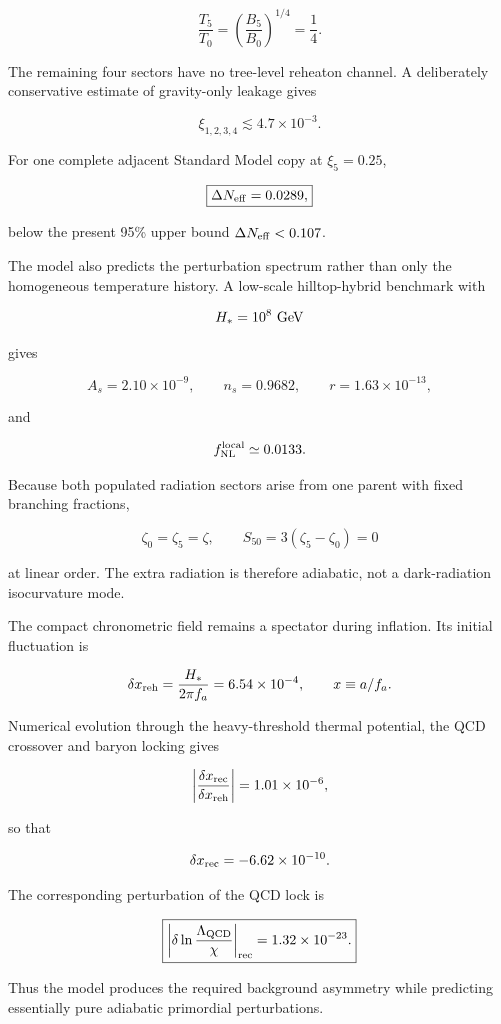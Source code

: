 \documentclass[
  10pt,
]{article}
\begin{document}
\[
\boxed{
\frac{T_5}{T_0}
=
\left(\frac{B_5}{B_0}\right)^{1/4}
=\frac14.
}
\]

The remaining four sectors have no tree-level reheaton channel. A
deliberately conservative estimate of gravity-only leakage gives

\[
\xi_{1,2,3,4}\lesssim4.7\times10^{-3}.
\]

For one complete adjacent Standard Model copy at \(\xi_5=0.25\),

\[
\boxed{
\Delta N_{\rm eff}=0.0289,
}
\]

below the present 95\% upper bound \(\Delta N_{\rm eff}<0.107\).

The model also predicts the perturbation spectrum rather than only the
homogeneous temperature history. A low-scale hilltop-hybrid benchmark
with

\[
H_*=10^8\ {\rm GeV}
\]

gives

\[
A_s=2.10\times10^{-9},
\qquad
n_s=0.9682,
\qquad
r=1.63\times10^{-13},
\]

and

\[
f_{\rm NL}^{\rm local}\simeq0.0133.
\]

Because both populated radiation sectors arise from one parent with
fixed branching fractions,

\[
\boxed{
\zeta_0=\zeta_5=\zeta,
\qquad
S_{50}=3(\zeta_5-\zeta_0)=0
}
\]

at linear order. The extra radiation is therefore adiabatic, not a
dark-radiation isocurvature mode.

The compact chronometric field remains a spectator during inflation. Its
initial fluctuation is

\[
\delta x_{\rm reh}
=
\frac{H_*}{2\pi f_a}
=6.54\times10^{-4},
\qquad
x\equiv a/f_a.
\]

Numerical evolution through the heavy-threshold thermal potential, the
QCD crossover and baryon locking gives

\[
\left|\frac{\delta x_{\rm rec}}{\delta x_{\rm reh}}\right|
=1.01\times10^{-6},
\]

so that

\[
\delta x_{\rm rec}=-6.62\times10^{-10}.
\]

The corresponding perturbation of the QCD lock is

\[
\boxed{
\left|\delta\ln\frac{\Lambda_{\rm QCD}}{\chi}\right|_{\rm rec}
=1.32\times10^{-23}.
}
\]

Thus the model produces the required background asymmetry while
predicting essentially pure adiabatic primordial perturbations.
\end{document}
